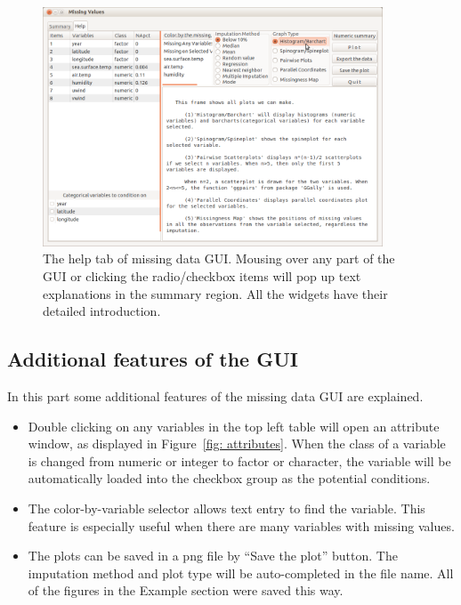 \documentclass[article]{jss}
\begin{document}
\begin{center}
\begin{figure}[h]
\begin{centering}
\includegraphics[width=0.9\textwidth]{fig8}
\par\end{centering}
\caption{The help tab of missing data GUI. Mousing over any part of the GUI or clicking the radio/checkbox items will pop up text explanations in the summary region. All the widgets have their detailed introduction.}
\label{fig: missingGUI-help}
\end{figure}
\par\end{center}


\subsection{Additional features of the GUI}
In this part some additional features of the missing data GUI are explained.
\begin{itemize}
\item Double clicking on any variables in the top left table will open an attribute window, as displayed in Figure~\ref{fig: attributes}. When the class of a variable is changed from numeric or integer to factor or character, the variable will be automatically loaded into the checkbox group as the potential conditions.
\item The color-by-variable selector allows text entry to find the variable. This feature is especially useful when there are many variables with missing values.
\item The plots can be saved in a png file by ``Save the plot'' button. The imputation method and plot type will be auto-completed in the file name. All of the figures in the Example section were saved this way.
\end{itemize}
\end{document}

